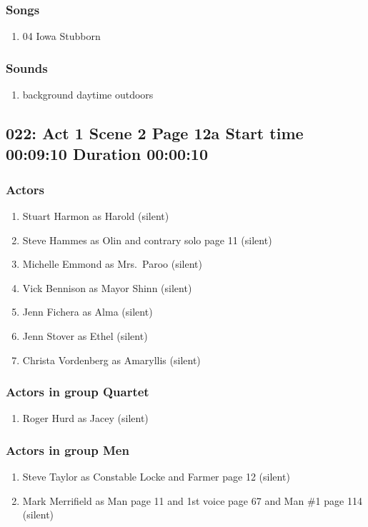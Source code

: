 \subsubsection{Songs}
\begin{enumerate}
\item 04 Iowa Stubborn
\end{enumerate}\subsubsection{Sounds}
\begin{enumerate}
\item background daytime outdoors
\end{enumerate}
\subsection{022: Act 1 Scene 2 Page 12a Start time 00:09:10 Duration 00:00:10}

\subsubsection{Actors}
\begin{enumerate}
\item Stuart Harmon as Harold (silent)
\item Steve Hammes as Olin and contrary solo page 11 (silent)
\item Michelle Emmond as Mrs.~Paroo (silent)
\item Vick Bennison as Mayor Shinn (silent)
\item Jenn Fichera as Alma (silent)
\item Jenn Stover as Ethel (silent)
\item Christa Vordenberg as Amaryllis (silent)
\end{enumerate}
\subsubsection{Actors in group Quartet}
\begin{enumerate}
\item Roger Hurd as Jacey (silent)
\end{enumerate}
\subsubsection{Actors in group Men}
\begin{enumerate}
\item Steve Taylor as Constable Locke and Farmer page 12 (silent)
\item Mark Merrifield as Man page 11 and 1st voice page 67 and Man \#1 page 114 (silent)
\end{enumerate}
